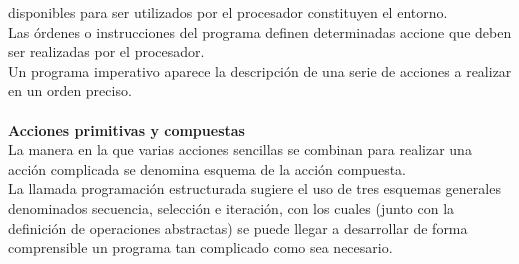 \documentclass[11pt,a4paper]{article}
\begin{document}
	disponibles para ser utilizados por el procesador constituyen el entorno.\\
	Las órdenes o instrucciones del programa definen determinadas accione que
	deben ser realizadas por el procesador.\\ Un programa imperativo aparece la descripción de una serie de acciones a realizar en un orden preciso.\\
	\\ 
	\textbf{Acciones primitivas y compuestas}\\
	La manera en la que varias acciones sencillas se combinan para realizar una acción complicada se denomina
	esquema de la acción compuesta.\\
	La llamada programación estructurada sugiere el uso de tres
	esquemas generales denominados secuencia, selección e iteración, con los cuales
	(junto con la definición de operaciones abstractas) se puede llegar a desarrollar
	de forma comprensible un programa tan complicado como sea necesario. 
\end{document}
